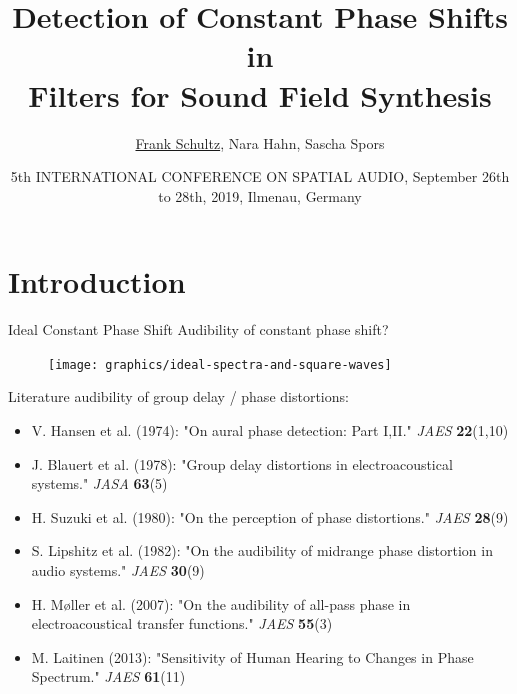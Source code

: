\documentclass[mathserif]{beamer}
\title[Audibility Constant Phase Shifts]%
  {Detection of Constant Phase Shifts in\\Filters for Sound Field Synthesis}
\author[Schultz, Hahn, Spors]{%
    \underline{Frank Schultz},
    Nara Hahn,
    Sascha Spors
}
\date[2019-09-28]{%
  5th INTERNATIONAL CONFERENCE ON SPATIAL AUDIO, September 26th to 28th, 2019,
  Ilmenau, Germany
}
\institute[]{Research Group Signal Processing and Virtual Acoustics\\University of Rostock}
\begin{document}
\maketitle
%
%
%
\section{Introduction}
%
\begin{frame}[label=introslide]{Ideal Constant Phase Shift}
Audibility of constant phase shift?
\begin{figure}
\texttt{[image: graphics/ideal-spectra-and-square-waves]}
\end{figure}
%
Literature audibility of group delay / phase distortions:

\begin{itemize}
\setlength\itemsep{-0.1em}
\scriptsize
\item V. Hansen et al. (1974):
"On aural \textcolor{colnonzero}{phase} detection: Part I,II." \textit{JAES} \textbf{22}(1,10)
\item J. Blauert  et al. (1978): "\textcolor{colnonzero}{Group delay distortions}
in electroacoustical systems."
\textit{JASA} \textbf{63}(5)
\item H. Suzuki et al. (1980): "On the perception of
\textcolor{colnonzero}{phase distortions}."
\textit{JAES} \textbf{28}(9)
\item S. Lipshitz et al. (1982): "On the audibility of
\textcolor{colnonzero}{midrange phase distortion} in audio systems."
\textit{JAES} \textbf{30}(9)
\item H. Møller et al. (2007):
"On the audibility of \textcolor{colnonzero}{all-pass phase}
in electroacoustical transfer functions."
\textit{JAES} \textbf{55}(3)
\item M. Laitinen (2013): "Sensitivity of Human Hearing to Changes in
\textcolor{colnonzero}{Phase} Spectrum." \textit{JAES} \textbf{61}(11)
\end{itemize}
\end{frame}
%
%
%
\end{document}
